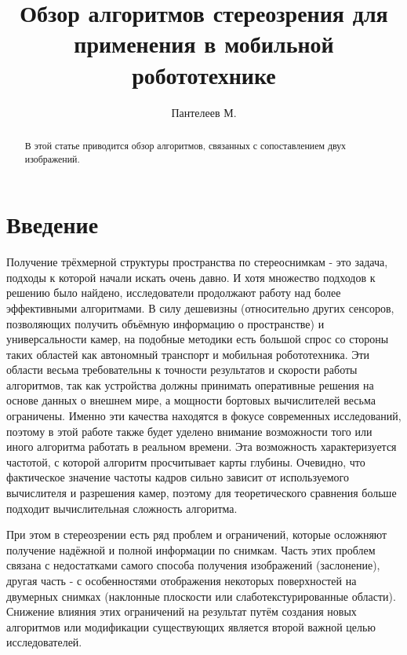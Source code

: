 

\raggedbottom
%


\title{Обзор алгоритмов стереозрения для применения в мобильной робототехнике}
\author{Пантелеев М.}
\maketitle

\begin{abstract}
	В этой статье приводится обзор алгоритмов, связанных с сопоставлением двух изображений.
\end{abstract}

\section{Введение}
Получение трёхмерной структуры пространства по стереоснимкам - это задача, подходы к которой начали искать очень давно. И хотя 
множество подходов к решению было найдено, исследователи продолжают работу над более эффективными алгоритмами. В силу дешевизны (относительно других сенсоров,
позволяющих получить объёмную информацию о пространстве) и универсальности камер, на подобные методики есть большой спрос со стороны 
таких областей как автономный транспорт и мобильная робототехника. 					%
Эти области весьма требовательны к точности результатов и скорости работы алгоритмов, так как устройства должны принимать оперативные решения на основе 
данных о внешнем мире, а мощности бортовых вычислителей весьма ограничены. Именно эти качества находятся в фокусе современных исследований, поэтому в этой 
работе также будет уделено внимание возможности того или иного алгоритма работать в реальном времени. Эта возможность характеризуется частотой, с которой 
алгоритм просчитывает карты глубины. Очевидно, что фактическое значение частоты кадров сильно зависит от используемого вычислителя и разрешения камер, поэтому 
для теоретического сравнения больше подходит вычислительная сложность алгоритма. 

При этом в стереозрении есть ряд проблем и ограничений, которые осложняют получение надёжной и полной информации по снимкам. Часть этих проблем 
связана с недостатками самого способа получения изображений (заслонение), другая часть - с особенностями отображения некоторых поверхностей на 
двумерных снимках (наклонные плоскости или слаботекстурированные области). Снижение влияния этих 
ограничений на результат путём создания новых алгоритмов или модификации существующих является второй важной целью исследователей. 

